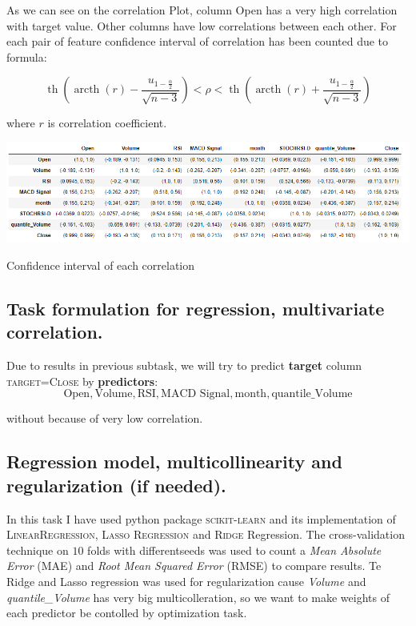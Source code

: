 \documentclass[%
12pt, %
final, %
oneside, %
onecolumn, %
centertags]{article} %
\theoremstyle{plain}
\theoremstyle{definition}
\theoremstyle{remark}
\begin{document}
As we can see on the correlation Plot, column Open has a very high correlation with target value. Other columns have low correlations between each other. For each pair of feature confidence interval of correlation has been counted due to formula:

$$\operatorname{th}\left(\operatorname{arcth}(r) - \frac{u_{1 - \frac{\alpha}{2}}}{\sqrt{n-3}}\right) < \rho < \operatorname{th}\left(\operatorname{arcth}(r) + \frac{u_{1 - \frac{\alpha}{2}}}{\sqrt{n-3}}\right)$$

where $r$ is correlation coefficient.

\begin{center}
\includegraphics[scale=0.6]{images/corr_coef.png}

Confidence interval of each correlation
\end{center}

\subsection{Task formulation for regression, multivariate correlation.}

Due to results in previous subtask, we will try to predict \textbf{target} column \textsc{target=Close} by \textbf{predictors}:
$$\text{Open}, \text{Volume}, \text{RSI}, \text{MACD Signal}, \text{month}, \text{quantile\_Volume}$$

without  because of very low correlation.

\subsection{Regression model, multicollinearity and regularization (if needed).}

In this task I have used python package \textsc{scikit-learn} and its implementation of \textsc{LinearRegression}, \textsc{Lasso Regression} and \textsc{Ridge} Regression. The cross-validation technique on $10$ folds with differentseeds was used to count a \textit{Mean Absolute Error} (MAE) and \textit{Root Mean Squared Error} (RMSE) to compare results. Te Ridge and Lasso regression was used for regularization cause \textit{Volume} and \textit{quantile\_Volume} has very big multicolleration, so we want to make weights of each predictor be contolled by optimization task. 
\end{document}
